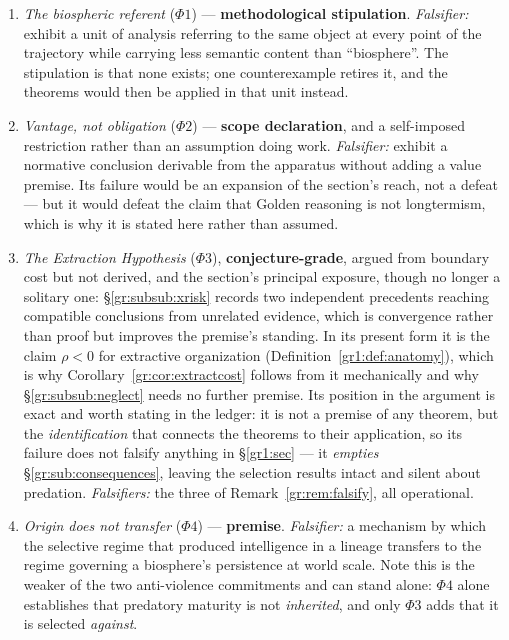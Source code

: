 \documentclass[11pt]{article}
\numberwithin{equation}{section}
\theoremstyle{plain}
\theoremstyle{definition}
\theoremstyle{remark}
\begin{document}
\begin{enumerate}[itemsep=2pt]
\item \emph{The biospheric referent} ($\Phi1$) ---
\textbf{methodological stipulation}. \emph{Falsifier:} exhibit a unit of
analysis referring to the same object at every point of the trajectory
while carrying less semantic content than ``biosphere''. The stipulation
is that none exists; one counterexample retires it, and the theorems
would then be applied in that unit instead.

\item \emph{Vantage, not obligation} ($\Phi2$) --- \textbf{scope
declaration}, and a self-imposed restriction rather than an assumption
doing work. \emph{Falsifier:} exhibit a normative conclusion derivable
from the apparatus without adding a value premise. Its failure would be
an expansion of the section's reach, not a defeat --- but it would
defeat the claim that Golden reasoning is not longtermism, which is why it is stated here rather than assumed.

\item \emph{The Extraction Hypothesis} ($\Phi3$), \textbf{conjecture-grade}, argued from boundary cost but not derived,
and the section's principal exposure, though no longer a solitary
one: \S\ref{gr:subsub:xrisk} records two independent precedents
\cite{Tainter88,Bostrom19} reaching compatible conclusions from
unrelated evidence, which is convergence rather than proof but improves
the premise's standing. In its present form it is the
claim $\rho<0$ for extractive organization
(Definition~\ref{gr1:def:anatomy}), which is why
Corollary~\ref{gr:cor:extractcost} follows from it mechanically and why
\S\ref{gr:subsub:neglect} needs no further premise. Its position in the argument is
exact and worth stating in the ledger: it is not a premise of any
theorem, but the \emph{identification} that connects the theorems to
their application, so its failure does not falsify anything in
\S\ref{gr1:sec} --- it \emph{empties}
\S\ref{gr:sub:consequences}, leaving the selection results intact and
silent about predation. \emph{Falsifiers:} the three of
Remark~\ref{gr:rem:falsify}, all operational.

\item \emph{Origin does not transfer} ($\Phi4$) --- \textbf{premise}.
\emph{Falsifier:} a mechanism by which the selective regime that
produced intelligence in a lineage transfers to the regime governing a
biosphere's persistence at world scale. Note this is the weaker of the
two anti-violence commitments and can stand alone: $\Phi4$ alone
establishes that predatory maturity is not \emph{inherited}, and only
$\Phi3$ adds that it is selected \emph{against}.


\end{enumerate}
\end{document}
